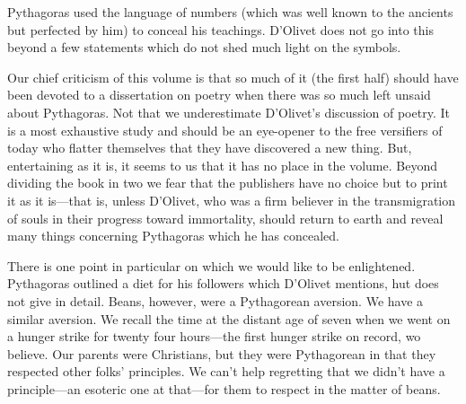 Pythagoras used the language of numbers (which was well known to the ancients but perfected by him) to conceal his teachings. D'Olivet does not go into this beyond a few statements which do not shed much light on the symbols.

Our chief criticism of this volume is that so much of it (the first half) should have been devoted to a dissertation on poetry when there was so much left unsaid about Pythagoras. Not that we underestimate D'Olivet's discussion of poetry. It is a most exhaustive study and should be an eye-opener to the free versifiers of today who flatter themselves that they have discovered a new thing. But, entertaining as it is, it seems to us that it has no place in the volume. Beyond dividing the book in two we fear that the publishers have no choice but to print it as it is—that is, unless D'Olivet, who was a firm believer in the transmigration of souls in their progress toward immortality, should return to earth and reveal many things concerning Pythagoras which he has concealed.

There is one point in particular on which we would like to be enlightened. Pythagoras outlined a diet for his followers which D'Olivet mentions, hut does not give in detail. Beans, however, were a Pythagorean aversion. We have a similar aversion. We recall the time at the distant age of seven when we went on a hunger strike for twenty four hours—the first hunger strike on record, wo believe. Our parents were Christians, but they were Pythagorean in that they respected other folks' principles. We can't help regretting that we didn't have a principle—an esoteric one at that—for them to respect in the matter of beans.

